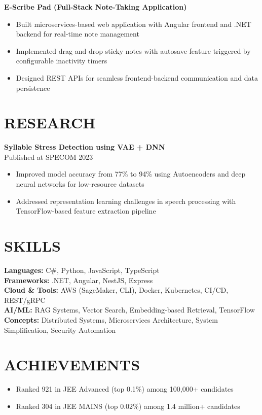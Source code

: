 \documentclass[letterpaper,11pt]{article}
\begin{document}
\textbf{E-Scribe Pad (Full-Stack Note-Taking Application)}
\begin{itemize}
    \item Built microservices-based web application with Angular frontend and .NET backend for real-time note management
    \item Implemented drag-and-drop sticky notes with autosave feature triggered by configurable inactivity timers
    \item Designed REST APIs for seamless frontend-backend communication and data persistence
\end{itemize}

\vspace{-6pt}

\section*{RESEARCH}

\textbf{Syllable Stress Detection using VAE + DNN} \\
Published at SPECOM 2023
\begin{itemize}
    \item Improved model accuracy from 77\% to 94\% using Autoencoders and deep neural networks for low-resource datasets
    \item Addressed representation learning challenges in speech processing with TensorFlow-based feature extraction pipeline
\end{itemize}

\vspace{-6pt}

\section*{SKILLS}

\textbf{Languages:} C\#, Python, JavaScript, TypeScript \\
\textbf{Frameworks:} .NET, Angular, NestJS, Express \\
\textbf{Cloud \& Tools:} AWS (SageMaker, CLI), Docker, Kubernetes, CI/CD, REST/gRPC \\
\textbf{AI/ML:} RAG Systems, Vector Search, Embedding-based Retrieval, TensorFlow \\
\textbf{Concepts:} Distributed Systems, Microservices Architecture, System Simplification, Security Automation

\vspace{-6pt}

\section*{ACHIEVEMENTS}

\begin{itemize}
    \item Ranked 921 in JEE Advanced (top 0.1\%) among 100,000+ candidates
    \item Ranked 304 in JEE MAINS (top 0.02\%) among 1.4 million+ candidates
\end{itemize}
\end{document}
